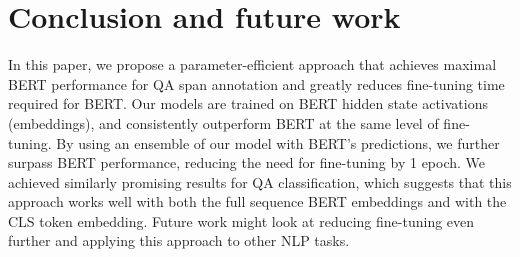 \section{Conclusion and future work}

In this paper, we propose a parameter-efficient approach that achieves maximal BERT performance for QA span annotation and greatly reduces fine-tuning time required for BERT. Our models are trained on BERT hidden state activations (embeddings), and consistently outperform BERT at the same level of fine-tuning. By using an ensemble of our model with BERT’s predictions, we further surpass BERT performance, reducing the need for fine-tuning by 1 epoch. We achieved similarly promising results for QA classification, which suggests that this approach works well with both the full sequence BERT embeddings and with the CLS token embedding. Future work might look at reducing fine-tuning even further and applying this approach to other NLP tasks.
